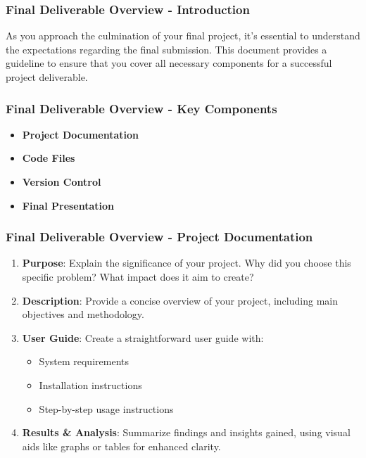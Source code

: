 \documentclass[aspectratio=169]{beamer}
\begin{document}
\begin{frame}[fragile]
    \frametitle{Final Deliverable Overview - Introduction}
    As you approach the culmination of your final project, it's essential to understand the expectations regarding the final submission. This document provides a guideline to ensure that you cover all necessary components for a successful project deliverable.
\end{frame}

\begin{frame}[fragile]
    \frametitle{Final Deliverable Overview - Key Components}
    \begin{itemize}
        \item \textbf{Project Documentation}
        \item \textbf{Code Files}
        \item \textbf{Version Control}
        \item \textbf{Final Presentation}
    \end{itemize}
\end{frame}

\begin{frame}[fragile]
    \frametitle{Final Deliverable Overview - Project Documentation}
    \begin{enumerate}
        \item \textbf{Purpose}: Explain the significance of your project. Why did you choose this specific problem? What impact does it aim to create?
        
        \item \textbf{Description}: Provide a concise overview of your project, including main objectives and methodology.
        
        \item \textbf{User Guide}: Create a straightforward user guide with:
        \begin{itemize}
            \item System requirements
            \item Installation instructions
            \item Step-by-step usage instructions
        \end{itemize}
        
        \item \textbf{Results \& Analysis}: Summarize findings and insights gained, using visual aids like graphs or tables for enhanced clarity.
    \end{enumerate}
\end{frame}
\end{document}
